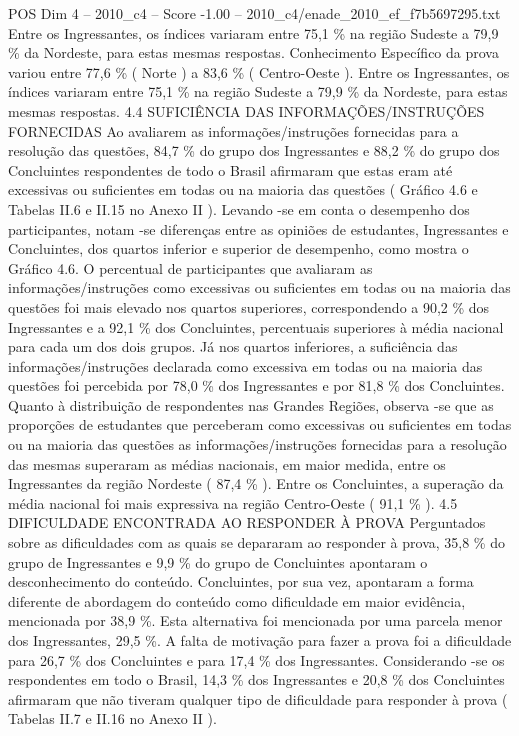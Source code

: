 \begin{textsample}{POS Dim 4 – 2010\_c4 – Score -1.00 – 2010\_c4/enade\_2010\_ef\_f7b5697295.txt}
Entre os Ingressantes, os índices variaram entre 75,1 \% na região Sudeste a 79,9 \% da Nordeste, para estas mesmas respostas.
Conhecimento Específico da prova variou entre 77,6 \% ( Norte ) a 83,6 \% ( Centro-Oeste ).
Entre os Ingressantes, os índices variaram entre 75,1 \% na região Sudeste a 79,9 \% da Nordeste, para estas mesmas respostas. 4.4 SUFICIÊNCIA DAS INFORMAÇÕES/INSTRUÇÕES FORNECIDAS Ao avaliarem as informações/instruções fornecidas para a resolução das questões, 84,7 \% do grupo dos Ingressantes e 88,2 \% do grupo dos Concluintes respondentes de todo o Brasil afirmaram que estas eram até excessivas ou suficientes em todas ou na maioria das questões ( Gráfico 4.6 e Tabelas II.6 e II.15 no Anexo II ).
Levando -se em conta o desempenho dos participantes, notam -se diferenças entre as opiniões de estudantes, Ingressantes e Concluintes, dos quartos inferior e superior de desempenho, como mostra o Gráfico 4.6.
O percentual de participantes que avaliaram as informações/instruções como excessivas ou suficientes em todas ou na maioria das questões foi mais elevado nos quartos superiores, correspondendo a 90,2 \% dos Ingressantes e a 92,1 \% dos Concluintes, percentuais superiores à média nacional para cada um dos dois grupos.
Já nos quartos inferiores, a suficiência das informações/instruções declarada como excessiva em todas ou na maioria das questões foi percebida por 78,0 \% dos Ingressantes e por 81,8 \% dos Concluintes.
Quanto à distribuição de respondentes nas Grandes Regiões, observa -se que as proporções de estudantes que perceberam como excessivas ou suficientes em todas ou na maioria das questões as informações/instruções fornecidas para a resolução das mesmas superaram as médias nacionais, em maior medida, entre os Ingressantes da região Nordeste ( 87,4 \% ).
Entre os Concluintes, a superação da média nacional foi mais expressiva na região Centro-Oeste ( 91,1 \% ). 4.5 DIFICULDADE ENCONTRADA AO RESPONDER À PROVA Perguntados sobre as dificuldades com as quais se depararam ao responder à prova, 35,8 \% do grupo de Ingressantes e 9,9 \% do grupo de Concluintes apontaram o desconhecimento do conteúdo.
Concluintes, por sua vez, apontaram a forma diferente de abordagem do conteúdo como dificuldade em maior evidência, mencionada por 38,9 \%.
Esta alternativa foi mencionada por uma parcela menor dos Ingressantes, 29,5 \%.
A falta de motivação para fazer a prova foi a dificuldade para 26,7 \% dos Concluintes e para 17,4 \% dos Ingressantes.
Considerando -se os respondentes em todo o Brasil, 14,3 \% dos Ingressantes e 20,8 \% dos Concluintes afirmaram que não tiveram qualquer tipo de dificuldade para responder à prova ( Tabelas II.7 e II.16 no Anexo II ).

\end{textsample}
